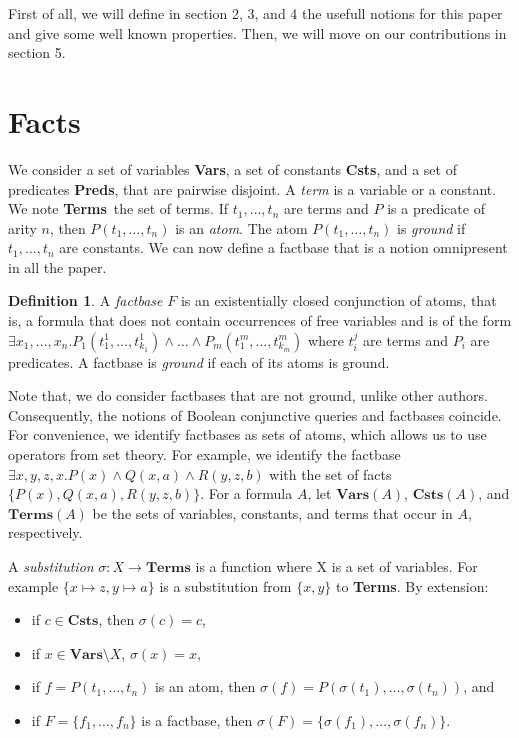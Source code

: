\documentclass{article}
\theoremstyle{definition}
\newtheorem{definition}{Definition}[section]
\theoremstyle{remark}
\newcommand{\Vars}{\textbf{Vars}}
\newcommand{\Terms}{\textbf{Terms}}
\newcommand{\Preds}{\textbf{Preds}}
\newcommand{\Csts}{\textbf{Csts}}
\begin{document}
First of all, we will define in section 2, 3, and 4 the usefull notions for this paper and give some well known properties. Then, we will move on our contributions in section 5. 


\section{Facts}


We consider a set of variables \Vars, a set of constants \Csts, and a set of predicates \Preds, that are pairwise disjoint. A \emph{term} is a variable or a constant. We note \Terms\ the set of terms. If $t_1,\ldots,t_n$ are terms and $P$ is a predicate of arity $n$, then $P(t_{1},\ldots,t_{n})$ is an \emph{atom}. The atom $P(t_{1},\ldots,t_{n})$ is \emph{ground} if $t_1,\ldots,t_n$ are constants. We can now define a factbase that is a notion omnipresent in all the paper.  


\begin{definition}
A \emph{factbase} $F$ is an existentially closed conjunction of atoms, that is, a formula that does not contain occurrences of free variables and is of the form $\exists x_{1},\ldots,x_{n}.P_{1}(t_{1}^{1},\ldots,t_{k_{1}}^{1})\land \ldots\land P_{m}(t_{1}^{m},\ldots,t_{k_{m}}^{m})$ where $t_i^j$ are terms and $P_i$ are predicates. A factbase is \emph{ground} if each of its atoms is ground.
\end{definition}

Note that, we do consider factbases that are not ground, unlike other authors. Consequently, the notions of Boolean conjunctive queries and factbases coincide. For convenience, we identify factbases as sets of atoms, which allows us to  use operators from set theory. For example, we identify the factbase $\exists x,y,z,x. P(x) \land Q(x,a) \land R(y,z,b)$ with the set of facts $\{P(x),Q(x,a),R(y,z,b)\}$. For a formula $A$, let \emph{$\Vars(A)$}, \emph{$\Csts(A)$}, and \emph{$\Terms(A)$} be the sets of variables, constants, and terms that occur in $A$, respectively.

 



A \emph{substitution} $\sigma:X \to \Terms$ is a function where X is a set of variables. For example $\{x \mapsto z, y \mapsto a \}$ is a substitution from $\{x,y\}$ to \Terms. By extension: 
\begin{itemize}
\item if $c \in \Csts$, then $\sigma(c) = c$,
\item if $x \in \Vars \setminus X$, $\sigma(x) = x$,
\item if $f = P(t_1,\ldots,t_n)$ is an atom, then $\sigma(f) = P(\sigma(t_1),\ldots,\sigma(t_n))$, and
\item if $F = \{f_1,\ldots,f_n\}$ is a factbase, then $\sigma(F) = \{\sigma(f_1),\ldots,\sigma(f_n)\}$.
\end{itemize}
\end{document}
